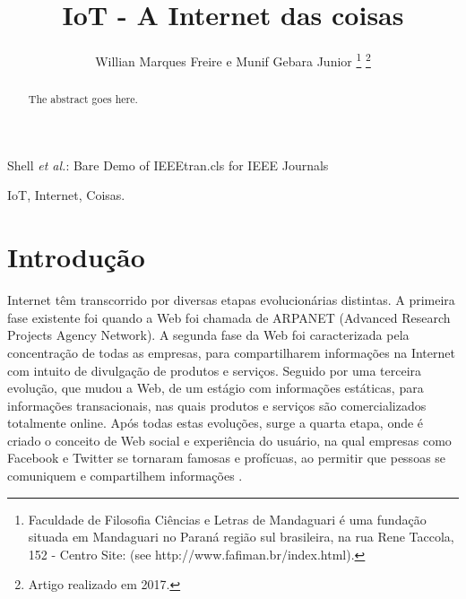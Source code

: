 \documentclass[journal]{IEEEtran}
\begin{document}
\title{IoT - A Internet das coisas}


\author{Willian Marques Freire e
        Munif Gebara Junior%
\thanks{Faculdade de Filosofia Ciências e Letras de Mandaguari é uma fundação
situada em Mandaguari no Paraná região sul brasileira,
na rua Rene Taccola, 152 - Centro Site: (see http://www.fafiman.br/index.html).}%
\thanks{Artigo realizado em 2017.}}



%
{Shell \MakeLowercase{\textit{et al.}}: Bare Demo of IEEEtran.cls for IEEE Journals}

\maketitle

\begin{abstract}
The abstract goes here.
\end{abstract}

\begin{IEEEkeywords}
IoT, Internet, Coisas.
\end{IEEEkeywords}




\IEEEpeerreviewmaketitle



\section{Introdução}

 Internet têm transcorrido por diversas etapas evolucionárias distintas. A primeira fase existente foi quando a Web foi chamada de ARPANET (Advanced Research Projects Agency Network). A segunda fase da Web foi caracterizada pela concentração de todas as empresas, para compartilharem informações na Internet com intuito de divulgação de produtos e serviços. Seguido por uma terceira evolução, que mudou a Web, de um estágio com informações estáticas, para informações transacionais, nas quais produtos e serviços são comercializados totalmente online. Após todas estas evoluções, surge a quarta etapa, onde é criado o conceito de Web social e experiência do usuário, na qual empresas como Facebook e Twitter se tornaram famosas e profícuas, ao permitir que pessoas se comuniquem e compartilhem informações \cite[p.~6]{Evans}.
\end{document}
